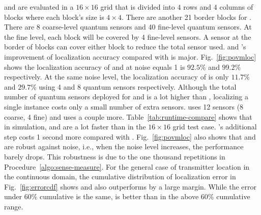 \povm and \povmpro are evaluated in a $16\times16$ grid that is divided into $4$ rows and $4$ columns of blocks where each block's size is $4\times4$.
There are another 21 border blocks for \povmpro.
There are 8 coarse-level quantum sensors and 40 fine-level quantum sensors.
At the fine level, each block will be covered by 4 fine-level sensors.
A sensor at the border of blocks can cover either block to reduce the total sensor used.
\povm and \povmpro's improvement of localization accuracy compared with \povmone is major.
Fig.~\ref{fig:povmloc} shows the localization accuracy of \povm and \povmpro at noise equals 1 is $92.5\%$ and $99.2\%$ respectively.
At the same noise level, the localization accuracy of \povmone is only $11.7\%$ and $29.7\%$ using 4 and 8 quantum sensors respectively.
Although the total number of quantum sensors deployed for \povm and \povmpro is a lot higher than \povmone, localizing a single instance  costs only a small number of extra sensors.
\povm uses 12 sensors (8 coarse, 4 fine) and \povmpro uses a couple more.
Table~\ref{tab:runtime-compare} shows that in simulation, 
\povm and \povmpro are a lot faster than \povmone in the $16\times 16$ grid test case.
\povmpro's additional step costs 1 second more compared with \povm.
Fig.~\ref{fig:povmloc} also shows that \povm and \povmpro are robust against noise, i.e., when the noise level increases, the performance barely drops.
This robustness is due to the one thousand repetitions in Procedure~\ref{algo:sense-measure}.
For the general case of transmitter location in the continuous domain, the cumulative distribution of localization error in Fig.~\ref{fig:errorcdf} shows \povm and \povmpro also outperforms \povmone by a large margin.
While the error under $60\%$ cumulative is the same, \povmpro is better than \povm in the above $60\%$ cumulative range.

